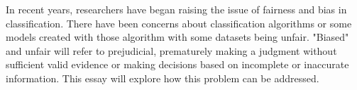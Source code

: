 \documentclass[a4paper, 12pt, titlepage]{article}
\begin{document}


In recent years, researchers have began raising the issue of fairness and bias in  classification. There have been concerns about classification algorithms or some models created with those algorithm with some datasets being unfair. "Biased" and unfair will refer to prejudicial, prematurely making a judgment without sufficient valid evidence or making decisions based on incomplete or inaccurate information. This essay will explore how this problem can be addressed.
\end{document}
